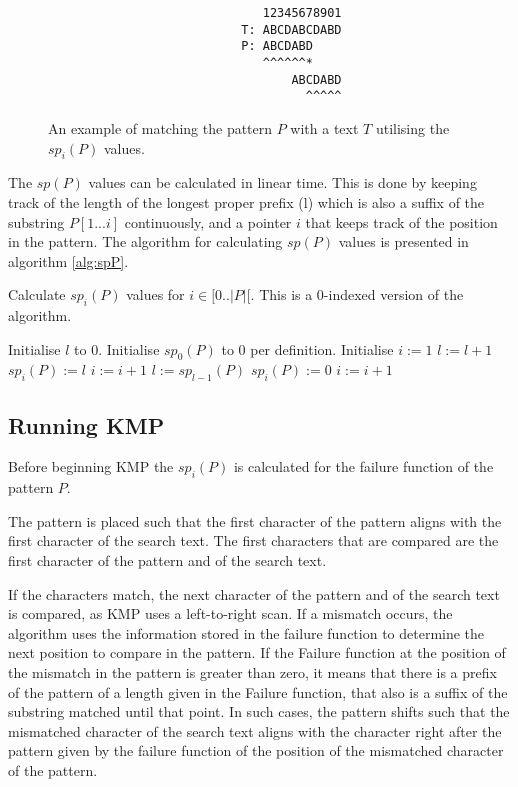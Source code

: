 \begin{figure}[H]
\begin{verbatim}
                              12345678901
                           T: ABCDABCDABD
                           P: ABCDABD
                              ^^^^^^*
                                  ABCDABD
                                    ^^^^^
\end{verbatim}
\caption{An example of matching the pattern $P$ with a text $T$ utilising the $sp_i(P)$ values.}
\label{fig:KMPshift}
\end{figure}

The $sp(P)$ values can be calculated in linear time. This is done by keeping track of the length of the longest proper prefix (l) which is also a suffix of the substring $P[1...i]$ continuously, and a pointer $i$ that keeps track of the position in the pattern. The algorithm for calculating $sp(P)$ values is presented in algorithm \ref{alg:spP}.

\begin{algorithm}[t]
\caption{Calculate $sp_i(P)$ values for $i \in [0..|P|[$. This is a $0$-indexed version of the algorithm. }\label{alg:spP}
\begin{algorithmic}
\State Initialise $l$ to 0.
\State Initialise $sp_0(P)$ to 0 per definition.
\State Initialise $i := 1$
        \State $l := l + 1$
        \State $sp_i(P) := l$
        \State $i := i + 1$
    \Else
            \State $l := sp_{l-1}(P)$
        \Else
            \State $sp_{i}(P) := 0$
            \State $i := i + 1$
        \EndIf
    \EndIf
\EndWhile
\end{algorithmic}
\end{algorithm}

\subsection{Running KMP}
Before beginning KMP the $sp_i(P)$ is calculated for the failure function of the pattern $P$. 

The pattern is placed such that the first character of the pattern aligns with the first character of the search text. The first characters that are compared are the first character of the pattern and of the search text. 

If the characters match, the next character of the pattern and of the search text is compared, as KMP uses a left-to-right scan. 
If a mismatch occurs, the algorithm uses the information stored in the failure function to determine the next position to compare in the pattern. If the Failure function at the position of the mismatch in the pattern is greater than zero, it means that there is a prefix of the pattern of a length given in the Failure function, that also is a suffix of the substring matched until that point. In such cases, the pattern shifts such that the mismatched character of the search text aligns with the character right after the pattern given by the failure function of the position of the mismatched character of the pattern.


